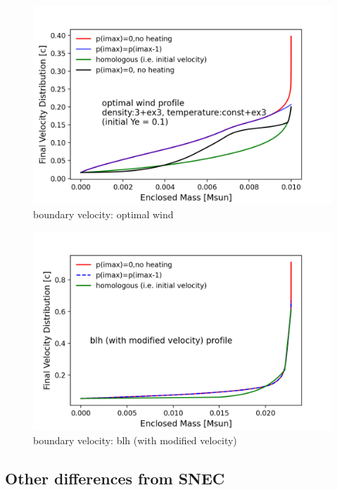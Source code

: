 \documentclass[fleqn,usenatbib]{mnras}
\begin{document}
    \begin{figure}
    \centering
    \includegraphics[scale=0.5]{figures/boundary/boundary_velocity_wind3ex3-Tex3.png}
    \caption{boundary velocity: optimal wind}
    \label{boundary_velocity_optimal_wind}
    \end{figure}   
    
    
    \begin{figure}
    \centering
    \includegraphics[scale=0.5]{figures/boundary/boundary_velocity_blh-mvel.png}
    \caption{boundary velocity: blh (with modified velocity)}
    \label{boundary_velocity_blh-mvel}
    \end{figure} 




    \subsection{Other differences from SNEC}
    
\end{document}
